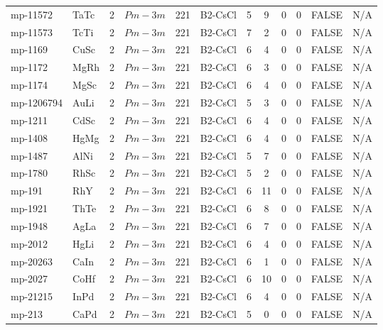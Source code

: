 {\begin{longtable}{llcccccccccc}
    mp-11572 & TaTc  & 2     & $Pm-3m$ & 221   & B2-CsCl & 5     & 9     & 0     & 0     & FALSE & N/A \\
    mp-11573 & TcTi  & 2     & $Pm-3m$ & 221   & B2-CsCl & 7     & 2     & 0     & 0     & FALSE & N/A \\
    mp-1169 & CuSc  & 2     & $Pm-3m$ & 221   & B2-CsCl & 6     & 4     & 0     & 0     & FALSE & N/A \\
    mp-1172 & MgRh  & 2     & $Pm-3m$ & 221   & B2-CsCl & 6     & 3     & 0     & 0     & FALSE & N/A \\
    mp-1174 & MgSc  & 2     & $Pm-3m$ & 221   & B2-CsCl & 6     & 4     & 0     & 0     & FALSE & N/A \\
    mp-1206794 & AuLi  & 2     & $Pm-3m$ & 221   & B2-CsCl & 5     & 3     & 0     & 0     & FALSE & N/A \\
    mp-1211 & CdSc  & 2     & $Pm-3m$ & 221   & B2-CsCl & 6     & 4     & 0     & 0     & FALSE & N/A \\
    mp-1408 & HgMg  & 2     & $Pm-3m$ & 221   & B2-CsCl & 6     & 4     & 0     & 0     & FALSE & N/A \\
    mp-1487 & AlNi  & 2     & $Pm-3m$ & 221   & B2-CsCl & 5     & 7     & 0     & 0     & FALSE & N/A \\
    mp-1780 & RhSc  & 2     & $Pm-3m$ & 221   & B2-CsCl & 5     & 2     & 0     & 0     & FALSE & N/A \\
    mp-191 & RhY   & 2     & $Pm-3m$ & 221   & B2-CsCl & 6     & 11    & 0     & 0     & FALSE & N/A \\
    mp-1921 & ThTe  & 2     & $Pm-3m$ & 221   & B2-CsCl & 6     & 8     & 0     & 0     & FALSE & N/A \\
    mp-1948 & AgLa  & 2     & $Pm-3m$ & 221   & B2-CsCl & 6     & 7     & 0     & 0     & FALSE & N/A \\
    mp-2012 & HgLi  & 2     & $Pm-3m$ & 221   & B2-CsCl & 6     & 4     & 0     & 0     & FALSE & N/A \\
    mp-20263 & CaIn  & 2     & $Pm-3m$ & 221   & B2-CsCl & 6     & 1     & 0     & 0     & FALSE & N/A \\
    mp-2027 & CoHf  & 2     & $Pm-3m$ & 221   & B2-CsCl & 6     & 10    & 0     & 0     & FALSE & N/A \\
    mp-21215 & InPd  & 2     & $Pm-3m$ & 221   & B2-CsCl & 6     & 4     & 0     & 0     & FALSE & N/A \\
    mp-213 & CaPd  & 2     & $Pm-3m$ & 221   & B2-CsCl & 5     & 0     & 0     & 0     & FALSE & N/A \\

\end{longtable}}
